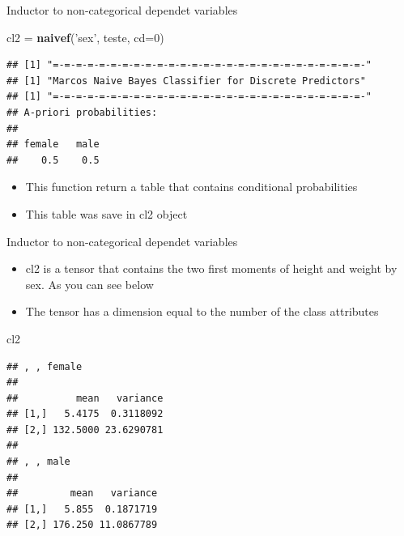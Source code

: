 \documentclass[
  10pt,
  ignorenonframetext,
]{beamer}
\newenvironment{Shaded}{\begin{snugshade}}{\end{snugshade}}
\newcommand{\DataTypeTok}[1]{\textcolor[rgb]{0.13,0.29,0.53}{#1}}
\newcommand{\DecValTok}[1]{\textcolor[rgb]{0.00,0.00,0.81}{#1}}
\newcommand{\KeywordTok}[1]{\textcolor[rgb]{0.13,0.29,0.53}{\textbf{#1}}}
\newcommand{\NormalTok}[1]{#1}
\newcommand{\StringTok}[1]{\textcolor[rgb]{0.31,0.60,0.02}{#1}}
\providecommand{\tightlist}{%
  \setlength{\itemsep}{0pt}\setlength{\parskip}{0pt}}
\begin{document}
\begin{frame}[fragile]{Inductor to non-categorical dependet variables}
\protect\hypertarget{inductor-to-non-categorical-dependet-variables}{}

\begin{Shaded}
\begin{Highlighting}[]
\NormalTok{cl2 =}\StringTok{ }\KeywordTok{naivef}\NormalTok{(}\StringTok{'sex'}\NormalTok{, teste, }\DataTypeTok{cd=}\DecValTok{0}\NormalTok{)}
\end{Highlighting}
\end{Shaded}

\begin{verbatim}
## [1] "=-=-=-=-=-=-=-=-=-=-=-=-=-=-=-=-=-=-=-=-=-=-=-=-=-=-=-"
## [1] "Marcos Naive Bayes Classifier for Discrete Predictors"
## [1] "=-=-=-=-=-=-=-=-=-=-=-=-=-=-=-=-=-=-=-=-=-=-=-=-=-=-=-"
## A-priori probabilities:
## 
## female   male 
##    0.5    0.5
\end{verbatim}

\begin{itemize}
\tightlist
\item
  This function return a table that contains conditional probabilities
\item
  This table was save in cl2 object
\end{itemize}

\end{frame}

\begin{frame}[fragile]{Inductor to non-categorical dependet variables}
\protect\hypertarget{inductor-to-non-categorical-dependet-variables-1}{}

\begin{itemize}
\tightlist
\item
  cl2 is a tensor that contains the two first moments of height and
  weight by sex. As you can see below
\item
  The tensor has a dimension equal to the number of the class attributes
\end{itemize}

\begin{Shaded}
\begin{Highlighting}[]
\NormalTok{cl2}
\end{Highlighting}
\end{Shaded}

\begin{verbatim}
## , , female
## 
##          mean   variance
## [1,]   5.4175  0.3118092
## [2,] 132.5000 23.6290781
## 
## , , male
## 
##         mean   variance
## [1,]   5.855  0.1871719
## [2,] 176.250 11.0867789
\end{verbatim}

\end{frame}
\end{document}
